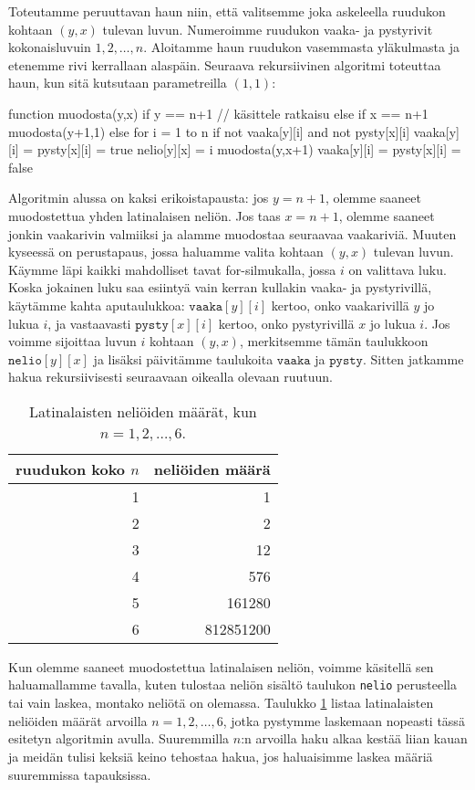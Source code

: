 Toteutamme peruuttavan haun niin, että valitsemme joka askeleella
ruudukon kohtaan $(y,x)$ tulevan luvun.
Numeroimme ruudukon vaaka- ja pystyrivit kokonaisluvuin $1,2,\dots,n$.
Aloitamme haun ruudukon vasemmasta yläkul\-masta ja etenemme
rivi kerrallaan alaspäin.
Seuraava rekursiivinen algoritmi toteuttaa haun,
kun sitä kutsutaan parametreilla $(1,1)$:

\begin{code}
function muodosta(y,x)
    if y == n+1
        // käsittele ratkaisu
    else if x == n+1
        muodosta(y+1,1)
    else
        for i = 1 to n
            if not vaaka[y][i] and not pysty[x][i]
                vaaka[y][i] = pysty[x][i] = true
                nelio[y][x] = i
                muodosta(y,x+1)
                vaaka[y][i] = pysty[x][i] = false
\end{code}

Algoritmin alussa on kaksi erikoistapausta:
jos $y=n+1$, olemme saaneet muodostettua
yhden latinalaisen neliön.
Jos taas $x=n+1$, olemme saaneet jonkin vaakarivin
valmiiksi ja alamme muodostaa seuraavaa vaakariviä.
Muuten kyseessä on perustapaus, jossa haluamme
valita kohtaan $(y,x)$ tulevan luvun.
Käymme läpi kaikki mahdolliset tavat for-silmukalla,
jossa $i$ on valittava luku.
Koska jokainen luku saa esiintyä vain kerran kullakin
vaaka- ja pystyrivillä, käytämme kahta aputaulukkoa:
$\texttt{vaaka}[y][i]$ kertoo, onko vaakarivillä $y$
jo lukua $i$, ja vastaavasti $\texttt{pysty}[x][i]$ kertoo,
onko pystyrivillä $x$ jo lukua $i$.
Jos voimme sijoittaa luvun $i$ kohtaan $(y,x)$,
merkitsemme tämän taulukkoon $\texttt{nelio}[y][x]$
ja lisäksi päivitämme taulukoita $\texttt{vaaka}$ ja $\texttt{pysty}$.
Sitten jatkamme hakua rekursiivisesti seuraavaan
oikealla olevaan ruutuun.

\begin{table}
\center
\begin{tabular}{rr}
ruudukon koko $n$ & neliöiden määrä \\
\hline
1 & 1 \\
2 & 2 \\
3 & 12 \\
4 & 576 \\
5 & 161280 \\
6 & 812851200 \\
\end{tabular}
\caption{Latinalaisten neliöiden määrät, kun $n=1,2,\dots,6$.}
\label{tab:latnel}
\end{table}

Kun olemme saaneet muodostettua latinalaisen neliön, voimme käsitellä
sen haluamallamme tavalla, kuten tulostaa neliön sisältö
taulukon \texttt{nelio} perusteella
tai vain laskea, montako neliötä on olemassa.
Taulukko \ref{tab:latnel} listaa latinalaisten neliöiden
määrät arvoilla $n=1,2,\dots,6$, jotka pystymme laskemaan
nopeasti tässä esitetyn algoritmin avulla.
Suuremmilla $n$:n arvoilla haku alkaa kestää liian kauan
ja meidän tulisi keksiä keino tehostaa hakua,
jos haluaisimme laskea määriä suuremmissa tapauksissa.

